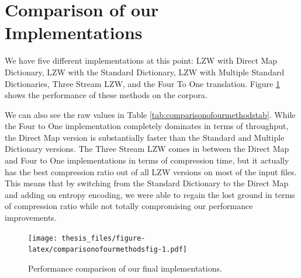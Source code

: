 \documentclass[12pt,twoside]{reedthesis}
\begin{document}
\hypertarget{comparison-of-our-implementations}{%
\section{Comparison of our Implementations}\label{comparison-of-our-implementations}}

We have five different implementations at this point: LZW with Direct Map Dictionary, LZW with the Standard Dictionary, LZW with Multiple Standard Dictionaries, Three Stream LZW, and the Four To One translation. Figure \ref{fig:comparisonofourmethodsfig} shows the performance of these methods on the corpora.

We can also see the raw values in Table \ref{tab:comparisonofourmethodstab}. While the Four to One implementation completely dominates in terms of throughput, the Direct Map version is substantially faster than the Standard and Multiple Dictionary versions. The Three Stream LZW comes in between the Direct Map and Four to One implementations in terms of compression time, but it actually has the best compression ratio out of all LZW versions on most of the input files. This means that by switching from the Standard Dictionary to the Direct Map and adding on entropy encoding, we were able to regain the lost ground in terms of compression ratio while not totally compromising our performance improvements.
\begin{figure}
\centering
\texttt{[image: thesis\_files/figure-latex/comparisonofourmethodsfig-1.pdf]}
\caption{\label{fig:comparisonofourmethodsfig}Performance comparison of our final implementations.}
\end{figure}
\end{document}
